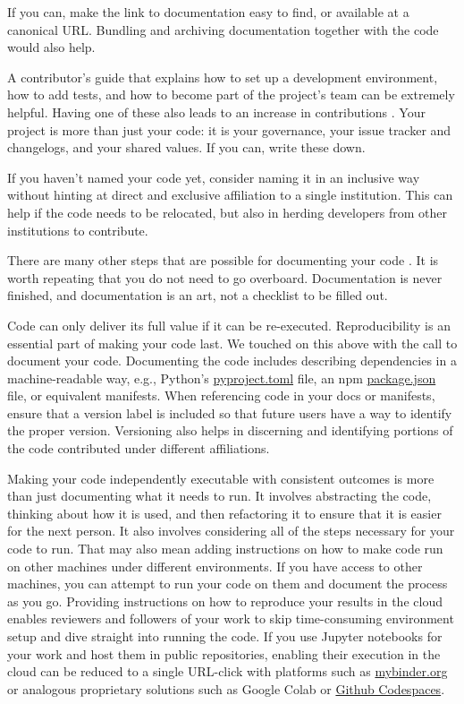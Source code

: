 \documentclass[10pt,letterpaper]{article}
\begin{document}
If you can, make the link to documentation easy to find, or available at a canonical URL.
Bundling and archiving documentation together with the code would also help.

A contributor's guide that explains how to set up a development environment,
how to add tests,
and how to become part of the project's team can be extremely helpful.
Having one of these also leads to an increase in contributions \cite{Sholler2019}.
Your project is more than just your code:
it is your governance,
your issue tracker and changelogs,
and your shared values.
If you can, write these down.

If you haven't named your code yet,
consider naming it in an inclusive way
without hinting at direct and exclusive affiliation to a single institution.
This can help if the code needs to be relocated,
but also in herding developers from other institutions to contribute.

There are many other steps that are possible for documenting your code \cite{Lee2018}.
It is worth repeating that you do not need to go overboard.
Documentation is never finished,
and documentation is an art,
not a checklist to be filled out.

Code can only deliver its full value if it can be re-executed.
Reproducibility is an essential part of making your code last.
We touched on this above with the call to document your code.
Documenting the code includes describing dependencies in a machine-readable way,
e.g., Python's \href{https://packaging.python.org/en/latest/guides/writing-pyproject-toml/}{pyproject.toml} file,
an npm \href{https://docs.npmjs.com/cli/v10/configuring-npm/package-json?v=true}{package.json} file,
or equivalent manifests.
When referencing code in your docs or manifests,
ensure that a version label is included
so that future users have a way to identify the proper version.
Versioning also helps in discerning and identifying portions of the code contributed under different affiliations.

Making your code independently executable with consistent outcomes
is more than just documenting what it needs to run.
It involves abstracting the code,
thinking about how it is used,
and then refactoring it to ensure that it is easier for the next person.
It also involves considering all of the steps necessary for your code to run.
That may also mean adding instructions on how to make code run on other machines under different environments.
If you have access to other machines,
you can attempt to run your code on them
and document the process as you go.
Providing instructions on how to reproduce your results in the cloud
enables reviewers and followers of your work to skip time-consuming environment setup
and dive straight into running the code.
If you use Jupyter notebooks for your work \cite{Perkel2018}
and host them in public repositories,
enabling their execution in the cloud can be reduced to a single URL-click
with platforms such as \href{http://mybinder.org}{mybinder.org}
or analogous proprietary solutions such as Google Colab
or \href{https://github.com/features/codespaces}{Github Codespaces}.
\end{document}
